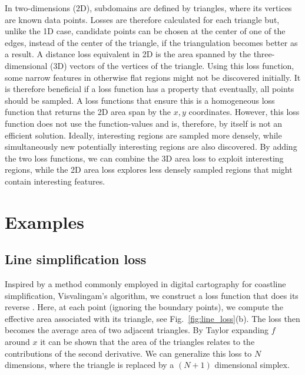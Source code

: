 In two-dimensions (2D), subdomains are defined by triangles, where its vertices are known data points.
Losses are therefore calculated for each triangle but, unlike the 1D case, candidate points can be chosen at the center of one of the edges, instead of the center of the triangle, if the triangulation becomes better as a result.
A distance loss equivalent in 2D is the area spanned by the three-dimensional (3D) vectors of the vertices of the triangle.
Using this loss function, some narrow features in otherwise flat regions might not be discovered initially.
It is therefore beneficial if a loss function has a property that eventually, all points should be sampled.
A loss functions that ensure this is a homogeneous loss function that returns the 2D area span by the $x, y$ coordinates.
However, this loss function does not use the function-values and is, therefore, by itself is not an efficient solution.
Ideally, interesting regions are sampled more densely, while simultaneously new potentially interesting regions are also discovered.
By adding the two loss functions, we can combine the 3D area loss to exploit interesting regions, while the 2D area loss explores less densely sampled regions that might contain interesting features.

\section{Examples}

\subsection{Line simplification loss}


Inspired by a method commonly employed in digital cartography for coastline simplification, Visvalingam's algorithm, we construct a loss function that does its reverse \cite{Visvalingam1990}.
Here, at each point (ignoring the boundary points), we compute the effective area associated with its triangle, see Fig.~\ref{fig:line_loss}(b).
The loss then becomes the average area of two adjacent triangles.
By Taylor expanding $f$ around $x$ it can be shown that the area of the triangles relates to the contributions of the second derivative.
We can generalize this loss to $N$ dimensions, where the triangle is replaced by a $(N+1)$ dimensional simplex.

